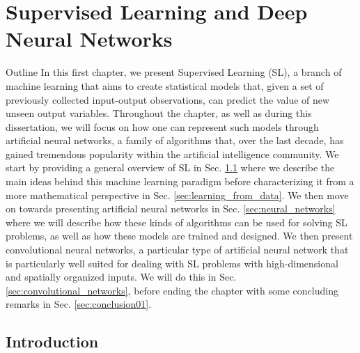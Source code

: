\chapter{Supervised Learning and Deep Neural Networks}
\label{ch:supervised_learning}

\begin{remark}{Outline}
	In this first chapter, we present Supervised Learning (SL), a branch of machine learning that aims to create statistical models that, given a set of previously collected input-output observations, can predict the value of new unseen output variables. Throughout the chapter, as well as during this dissertation, we will focus on how one can represent such models through artificial neural networks, a family of algorithms that, over the last decade, has gained tremendous popularity within the artificial intelligence community. We start by providing a general overview of SL in Sec. \ref{sec:introduction01} where we describe the main ideas behind this machine learning paradigm before characterizing it from a more mathematical perspective in Sec. \ref{sec:learning_from_data}. We then move on towards presenting artificial neural networks in Sec. \ref{sec:neural_networks} where we will describe how these kinds of algorithms can be used for solving SL problems, as well as how these models are trained and designed. We then present convolutional neural networks, a particular type of artificial neural network that is particularly well suited for dealing with SL problems with high-dimensional and spatially organized inputs. We will do this in Sec. \ref{sec:convolutional_networks}, before ending the chapter with some concluding remarks in Sec. \ref{sec:conclusion01}.   
\end{remark}

\section{Introduction}
\label{sec:introduction01}

